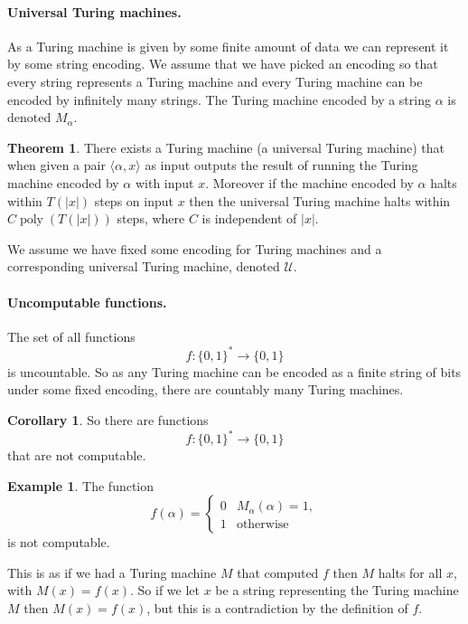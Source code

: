 \documentclass[11pt,a4paper]{article}
\theoremstyle{definition}
\newtheorem{thm}{Theorem}
\newtheorem{cor}{Corollary}
\newtheorem{ex}{Example}
\newcommand{\U}{\mathcal{U}}
\begin{document}
\paragraph{Universal Turing machines.}
As a Turing machine is given by some finite amount of data we can represent it by some string encoding.
We assume that we have picked an encoding so that every string represents a Turing machine and every Turing machine can be encoded by infinitely many strings.
The Turing machine encoded by a string $\alpha$ is denoted $M_\alpha$.
\begin{thm}
There exists a Turing machine (a universal Turing machine) that when given a pair $\langle \alpha,x\rangle$ as input outputs the result of running the Turing machine encoded by $\alpha$ with input $x$.
Moreover if the machine encoded by $\alpha$ halts within $T(|x|)$ steps on input $x$ then the universal Turing machine halts within $C\operatorname{poly}(T(|x|))$ steps, where $C$ is independent of $|x|$.
\end{thm}

We assume we have fixed some encoding for Turing machines and a corresponding universal Turing machine, denoted $\U$.

\paragraph{Uncomputable functions.}
The set of all functions
\[
f\colon\{0,1\}^*\to\{0,1\}
\]
is uncountable.
So as any Turing machine can be encoded as a finite string of bits under some fixed encoding, there are countably many Turing machines.
\begin{cor}
So there are functions
\[
f\colon\{0,1\}^*\to\{0,1\}
\]
that are not computable.
\end{cor}

\begin{ex}\label{firstuncomp}
The function
\[
f(\alpha) =\begin{cases} 0 & M_\alpha (\alpha) = 1,\\
1 &\text{otherwise}
\end{cases}
\]
is not computable.

This is as if we had a Turing machine $M$ that computed $f$ then $M$ halts for all $x$, with $M(x) = f(x)$.
So if we let $x$ be a string representing the Turing machine $M$ then $M(x) = f(x)$, but this is a contradiction by the definition of $f$.
\end{ex}
\end{document}
